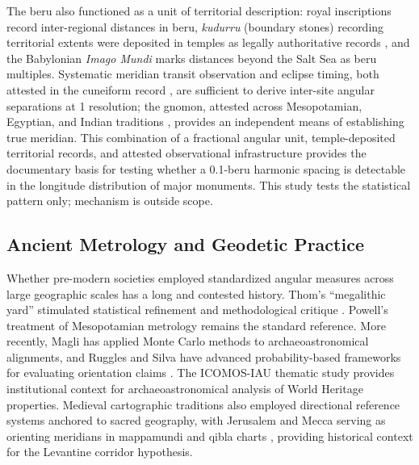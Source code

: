 \documentclass[HARVARD,twocolumn]{USG}
\begin{document}
The beru also functioned as a unit of territorial description: royal
inscriptions record inter-regional distances in beru, \textit{kudurru}
(boundary stones) recording territorial extents were deposited in temples
as legally authoritative records \citep{robson2008mathematics,powell1987metrological},
and the Babylonian \textit{Imago Mundi} marks distances beyond the Salt Sea
as beru multiples.
Systematic meridian transit observation and eclipse timing, both attested
in the cuneiform record \citep{hunger2019mul,neugebauer1975history}, are
sufficient to derive inter-site angular separations at 1\textdegree{} resolution;
the gnomon, attested across Mesopotamian, Egyptian, and Indian traditions
\citep{neugebauer1975history,shamasastry1915arthashastra}, provides an independent
means of establishing true meridian.
This combination of a fractional angular unit, temple-deposited territorial
records, and attested observational infrastructure provides the documentary
basis for testing whether a 0.1-beru harmonic spacing is detectable in the
longitude distribution of major monuments.
This study tests the statistical pattern only; mechanism is outside scope.

\subsection{Ancient Metrology and Geodetic Practice}

Whether pre-modern societies employed standardized angular measures
across large geographic scales has a long and contested history.
Thom's ``megalithic yard'' \citep{thom1967,thom1971,thom1964}
stimulated statistical refinement \citep{kendall1974} and methodological
critique \citep{freeman1976}. Powell's treatment of Mesopotamian metrology
\citep{powell1987metrological} remains the standard reference. More recently,
Magli \citep{magli2013,magli2016} has applied Monte Carlo methods to
archaeoastronomical alignments, and Ruggles and Silva have advanced
probability-based frameworks for evaluating orientation claims
\citep{ruggles1999astronomy,ruggles2015handbook,silva2020statistical}.
The ICOMOS-IAU thematic study \citep{ruggles2010icomos} provides
institutional context for archaeoastronomical analysis of World Heritage
properties. Medieval cartographic traditions also employed directional
reference systems anchored to sacred geography, with Jerusalem and Mecca
serving as orienting meridians in mappamundi and qibla charts
\citep{harvey1987mappamundi}, providing historical context for the
Levantine corridor hypothesis.
\end{document}
